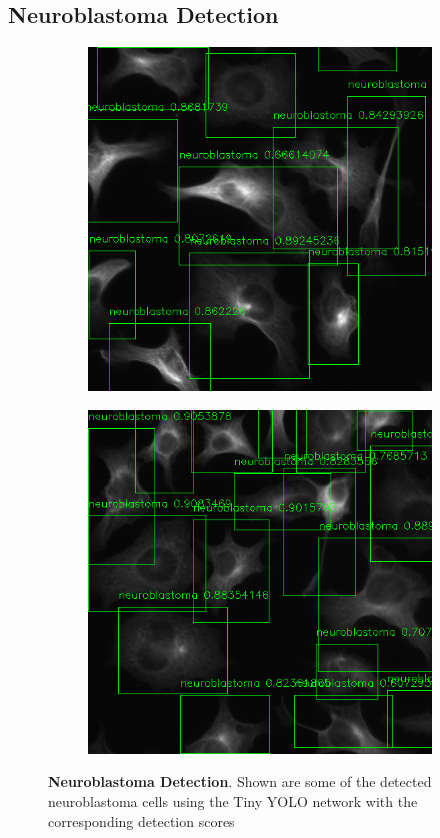 \documentclass[journal]{IEEEtran}
\begin{document}
\subsection{Neuroblastoma Detection}
\begin{figure}
\centering
\begin{subfigure}[b]{0.9\linewidth}
\includegraphics[width=\linewidth]{110084.png}
\caption{}
\end{subfigure}\vspace{2pt}
\begin{subfigure}[b]{0.9\linewidth}
\includegraphics[width=\linewidth]{110085.png}
\caption{}
\end{subfigure}
\caption{\textbf{Neuroblastoma Detection}. Shown are some of the detected neuroblastoma cells using the Tiny YOLO network with the corresponding detection scores}
\label{fig:neuroblastoma_yolo_results}
\end{figure}
\end{document}
